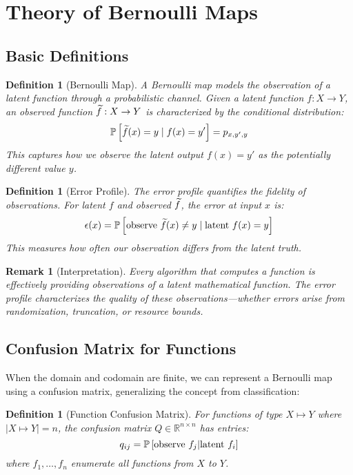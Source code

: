 \documentclass[11pt,final,hidelinks]{article}
\newtheorem{definition}[theorem]{Definition}
\newtheorem{remark}[theorem]{Remark}
\newcommand{\error}{\epsilon}
\begin{document}
\section{Theory of Bernoulli Maps}

\subsection{Basic Definitions}

\begin{definition}[Bernoulli Map]
A Bernoulli map models the observation of a latent function through a probabilistic channel. Given a latent function $f : X \to Y$, an observed function $\widetilde{f} : X \to Y$ is characterized by the conditional distribution:
\begin{equation}
\mathbb{P}\left[\widetilde{f}(x) = y \mid f(x) = y'\right] = p_{x,y',y}
\end{equation}
This captures how we observe the latent output $f(x) = y'$ as the potentially different value $y$.
\end{definition}

\begin{definition}[Error Profile]
The error profile quantifies the fidelity of observations. For latent $f$ and observed $\widetilde{f}$, the error at input $x$ is:
\begin{equation}
\error(x) = \Prob{\text{observe } \obs{f}(x) \neq y \mid \text{latent } f(x) = y}
\end{equation}
This measures how often our observation differs from the latent truth.
\end{definition}

\begin{remark}[Interpretation]
Every algorithm that computes a function is effectively providing observations of a latent mathematical function. The error profile characterizes the quality of these observations—whether errors arise from randomization, truncation, or resource bounds.
\end{remark}

\subsection{Confusion Matrix for Functions}

When the domain and codomain are finite, we can represent a Bernoulli map using a confusion matrix, generalizing the concept from classification:

\begin{definition}[Function Confusion Matrix]
For functions of type $X \mapsto Y$ where $|X \mapsto Y| = n$, the confusion matrix $Q \in \mathbb{R}^{n \times n}$ has entries:
\begin{equation}
q_{ij} = \mathbb{P}\left[\text{observe } f_j | \text{latent } f_i\right]
\end{equation}
where $f_1, \ldots, f_n$ enumerate all functions from $X$ to $Y$.
\end{definition}
\end{document}
